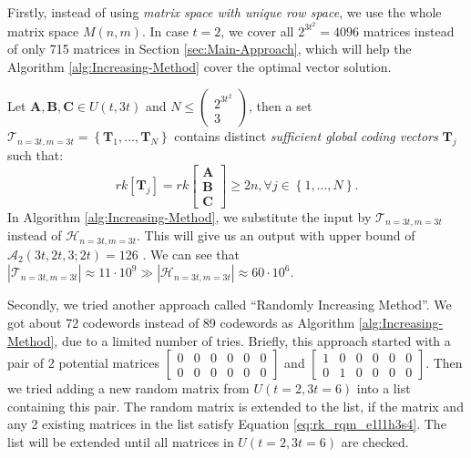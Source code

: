 Firstly, instead of using \textit{matrix space with unique row space},
we use the whole matrix space $M\left(n,m\right)$. In case $t=2$,
we cover all $2^{3t^{2}}=4096$ matrices instead of only 715 matrices
in Section \ref{sec:Main-Approach}, which will help the Algorithm
\ref{alg:Increasing-Method} cover the optimal vector solution.
\begin{defn}
 Let $\boldsymbol{A},\boldsymbol{B},\boldsymbol{C}\in U(t,3t)$ and
$N\leq\left(\begin{array}{c}
2^{3t^{2}}\\
3
\end{array}\right)$, then a set $\mathcal{T}_{n=3t,m=3t}=\left\{ \boldsymbol{T}_{1},\ldots,\boldsymbol{T}_{N}\right\} $
contains distinct \textit{sufficient global coding vectors} $\boldsymbol{T}_{j}$
such that:
\[
rk\left[\boldsymbol{T}_{j}\right]=rk\left[\begin{array}{c}
\boldsymbol{A}\\
\boldsymbol{B}\\
\boldsymbol{C}
\end{array}\right]\geq2n,\forall j\in\left\{ 1,\ldots,N\right\} .
\]
In Algorithm \ref{alg:Increasing-Method}, we substitute the input
by $\mathcal{T}_{n=3t,m=3t}$ instead of $\mathcal{H}_{n=3t,m=3t}$.
This will give us an output with upper bound of $\mathcal{A}_{2}\left(3t,2t,3;2t\right)=126$
\cite[Sec. V-B]{Zhang:2019}. We can see that $\left|\mathcal{T}_{n=3t,m=3t}\right|\approx11\cdot10^{9}\gg\left|\mathcal{H}_{n=3t,m=3t}\right|\approx60\cdot10^{6}$.
\end{defn}
Secondly, we tried another approach called ``Randomly Increasing
Method''. We got about 72 codewords instead of 89 codewords as Algorithm
\ref{alg:Increasing-Method}, due to a limited number of tries. Briefly,
this approach started with a pair of 2 potential matrices $\left[\begin{array}{cccccc}
0 & 0 & 0 & 0 & 0 & 0\\
0 & 0 & 0 & 0 & 0 & 0
\end{array}\right]$ and $\left[\begin{array}{cccccc}
1 & 0 & 0 & 0 & 0 & 0\\
0 & 1 & 0 & 0 & 0 & 0
\end{array}\right]$. Then we tried adding a new random matrix from $U\left(t=2,3t=6\right)$
into a list containing this pair. The random matrix is extended to
the list, if the matrix and any 2 existing matrices in the list satisfy
Equation \ref{eq:rk_rqm_e1l1h3s4}. The list will be extended until
all matrices in $U\left(t=2,3t=6\right)$ are checked.

